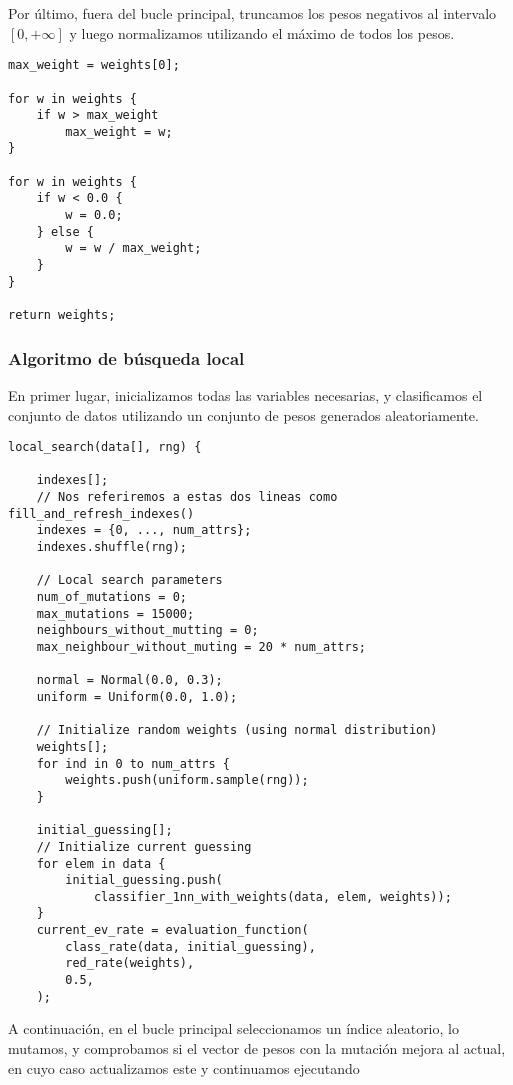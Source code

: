 \documentclass[size=a4, parskip=half, titlepage=false, toc=flat, toc=bib, 12pt]{scrartcl}
\begin{document}
Por último, fuera del bucle principal, truncamos los pesos negativos al intervalo $[0,+\infty]$ y luego normalizamos utilizando el máximo de todos los pesos.
\begin{verbatim}
max_weight = weights[0];

for w in weights {
    if w > max_weight
        max_weight = w;
}

for w in weights {
    if w < 0.0 {
        w = 0.0;
    } else {
        w = w / max_weight;
    }
}

return weights;
\end{verbatim}

\subsubsection{Algoritmo de búsqueda local}
En primer lugar, inicializamos todas las variables necesarias, y clasificamos el conjunto de datos utilizando un conjunto de pesos generados aleatoriamente.
\begin{verbatim}
local_search(data[], rng) {

    indexes[];
    // Nos referiremos a estas dos lineas como fill_and_refresh_indexes()
    indexes = {0, ..., num_attrs};
    indexes.shuffle(rng);

    // Local search parameters
    num_of_mutations = 0;
    max_mutations = 15000;
    neighbours_without_mutting = 0;
    max_neighbour_without_muting = 20 * num_attrs;

    normal = Normal(0.0, 0.3);
    uniform = Uniform(0.0, 1.0);

    // Initialize random weights (using normal distribution)
    weights[];
    for ind in 0 to num_attrs {
        weights.push(uniform.sample(rng));
    }

    initial_guessing[];
    // Initialize current guessing
    for elem in data {
        initial_guessing.push(
            classifier_1nn_with_weights(data, elem, weights));
    }
    current_ev_rate = evaluation_function(
        class_rate(data, initial_guessing),
        red_rate(weights),
        0.5,
    );
\end{verbatim}

A continuación, en el bucle principal seleccionamos un índice aleatorio, lo mutamos, y comprobamos si el vector de pesos con la mutación mejora al actual, en cuyo caso actualizamos este y continuamos ejecutando
\end{document}
